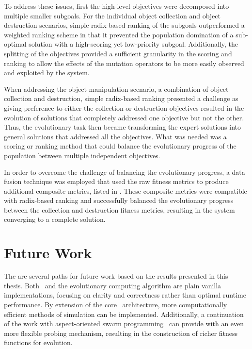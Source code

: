 To address these issues, first the high-level objectives were decomposed into multiple smaller subgoals.  For the individual object collection and object destruction scenarios, simple radix-based ranking of the subgoals outperformed a weighted ranking scheme in that it prevented the population domination of a sub-optimal solution with a high-scoring yet low-priority subgoal.  Additionally, the splitting of the objectives provided a sufficient granularity in the scoring and ranking to allow the effects of the mutation operators to be more easily observed and exploited by the system.

When addressing the object manipulation scenario, a combination of object collection and destruction, simple radix-based ranking presented a challenge as giving preference to either the collection or destruction objectives resulted in the evolution of  solutions that completely addressed one objective but not the other.  Thus, the evolutionary task then became transforming the expert solutions into general solutions that addressed all the objectives.  What was needed was a scoring or ranking method that could balance the evolutionary progress of the population between multiple independent objectives.  

In order to overcome the challenge of balancing the evolutionary progress, a data fusion technique was employed that used the raw fitness metrics to produce additional composite metrics, listed in .  These composite metrics were compatible with radix-based ranking and successfully balanced the evolutionary progress between the collection and destruction fitness metrics, resulting in the system converging to a complete solution.

\section{Future Work}

The are several paths for future work based on the results presented in this thesis.  Both \SWEEP{}\ and the evolutionary computing algorithm are plain vanilla implementations, focusing on clarity and correctness rather than optimal runtime performance.  By extension of the core \SWEEP{}\ architecture, more computationally efficient methods of simulation can be implemented.  Additionally, a continuation of the work with aspect-oriented swarm programming~\cite{pkovacina:AspectSwarms} can provide \SWEEP{} with an even more flexible probing mechanism, resulting in the construction of richer fitness functions for evolution.

